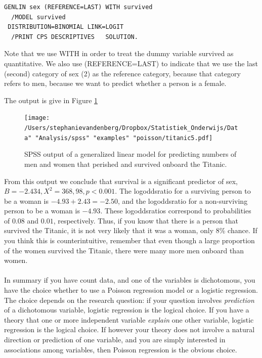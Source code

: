 \documentclass[]{book}\usepackage[]{graphicx}\usepackage[]{color}
\begin{document}
\begin{verbatim}
GENLIN sex (REFERENCE=LAST) WITH survived
  /MODEL survived
 DISTRIBUTION=BINOMIAL LINK=LOGIT
  /PRINT CPS DESCRIPTIVES   SOLUTION.
\end{verbatim}


Note that we use WITH in order to treat the dummy variable survived as quantitative. We also use (REFERENCE=LAST) to indicate that we use the last (second) category of sex (2) as the reference category, because that category refers to men, because we want to predict whether a person is a female.

The output is give in Figure \ref{fig:titanic5}

\begin{figure}[h]
    \begin{center}
       \texttt{[image: /Users/stephanievandenberg/Dropbox/Statistiek\_Onderwijs/Data" "Analysis/spss" "examples" "poisson/titanic5.pdf]}
    \end{center}
     \caption{SPSS output of a generalized linear model for predicting numbers of men and women that perished and survived onboard the Titanic.}
    \label{fig:titanic5}
\end{figure}


From this output we conclude that survival is a significant predictor of sex, $B=-2.434, X^2=368,98, p<0.001$. The logoddsratio for a surviving person to be a woman is $-4.93 +2.43= -2.50$, and the logoddsratio for a non-surviving person to be a woman is $-4.93$. These logoddsratios correspond to probabilities of $0.08$ and $0.01$, respectively. Thus, if you know that there is a person that survived the Titanic, it is not very likely that it was a woman, only 8\% chance. If you think this is counterintuitive, remember that even though a large proportion of the women survived the Titanic, there were many more men onboard than women.
\\
\\
In summary if you have count data, and one of the variables is dichotomous, you have the choice whether to use a Poisson regression model or a logistic regression. The choice depends on the research question: if your question involves \textit{prediction} of a dichotomous variable, logistic regression is the logical choice. If you have a theory that one or more independent variable \textit{explain} one other variable, logistic regression is the logical choice. If however your theory does not involve a natural direction or prediction of one variable, and you are simply interested in associations among variables, then Poisson regression is the obvious choice.
\end{document}
